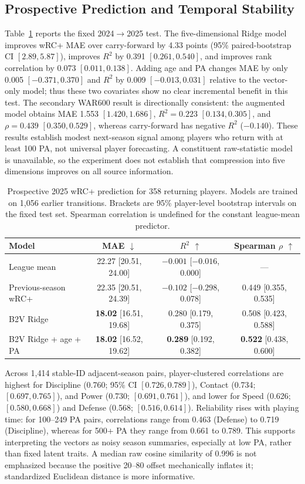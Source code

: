 \documentclass[10pt,twocolumn,letterpaper]{article}
\begin{document}
\subsection{Prospective Prediction and Temporal Stability}
\label{sec:prospective-results}
Table~\ref{tab:prospective} reports the fixed 2024$\to$2025 test. The five-dimensional Ridge model improves wRC+ MAE over carry-forward by 4.33 points (95\% paired-bootstrap CI $[2.89,5.87]$), improves $R^2$ by 0.391 $[0.261,0.540]$, and improves rank correlation by 0.073 $[0.011,0.138]$. Adding age and PA changes MAE by only 0.005 $[-0.371,0.370]$ and $R^2$ by 0.009 $[-0.013,0.031]$ relative to the vector-only model; thus these two covariates show no clear incremental benefit in this test. The secondary WAR600 result is directionally consistent: the augmented model obtains MAE 1.553 $[1.420,1.686]$, $R^2=0.223$ $[0.134,0.305]$, and $\rho=0.439$ $[0.350,0.529]$, whereas carry-forward has negative $R^2$ ($-0.140$). These results establish modest next-season signal among players who return with at least 100 PA, not universal player forecasting. A constituent raw-statistic model is unavailable, so the experiment does not establish that compression into five dimensions improves on all source information.

\begin{table}[t]
\centering
\caption{Prospective 2025 wRC+ prediction for 358 returning players. Models are trained on 1{,}056 earlier transitions. Brackets are 95\% player-level bootstrap intervals on the fixed test set. Spearman correlation is undefined for the constant league-mean predictor.}
\label{tab:prospective}
\small
\begin{tabular}{lccc}
\toprule
Model & MAE $\downarrow$ & $R^2$ $\uparrow$ & Spearman $\rho$ $\uparrow$ \\
\midrule
League mean & 22.27 [20.51, 24.00] & $-0.001$ [$-0.016$, 0.000] & --- \\
Previous-season wRC+ & 22.35 [20.51, 24.39] & $-0.102$ [$-0.298$, 0.078] & 0.449 [0.355, 0.535] \\
B2V Ridge & \textbf{18.02} [16.51, 19.68] & 0.280 [0.179, 0.375] & 0.508 [0.423, 0.588] \\
B2V Ridge + age + PA & \textbf{18.02} [16.52, 19.62] & \textbf{0.289} [0.192, 0.382] & \textbf{0.522} [0.438, 0.600] \\
\bottomrule
\end{tabular}
\end{table}

Across 1{,}414 stable-ID adjacent-season pairs, player-clustered correlations are highest for Discipline (0.760; 95\% CI $[0.726,0.789]$), Contact (0.734; $[0.697,0.765]$), and Power (0.730; $[0.691,0.761]$), and lower for Speed (0.626; $[0.580,0.668]$) and Defense (0.568; $[0.516,0.614]$). Reliability rises with playing time: for 100--249 PA pairs, correlations range from 0.463 (Defense) to 0.719 (Discipline), whereas for 500+ PA they range from 0.661 to 0.789. This supports interpreting the vectors as noisy season summaries, especially at low PA, rather than fixed latent traits. A median raw cosine similarity of 0.996 is not emphasized because the positive 20--80 offset mechanically inflates it; standardized Euclidean distance is more informative.
\end{document}
